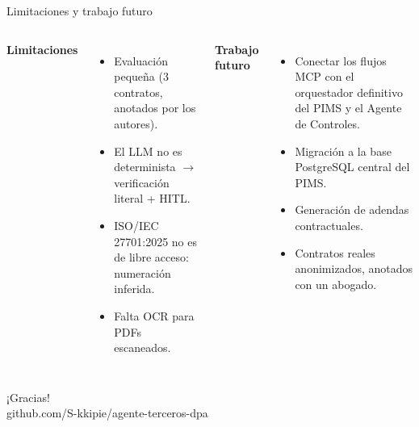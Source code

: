 \documentclass[aspectratio=169,10pt]{beamer}
\begin{document}
\begin{frame}{Limitaciones y trabajo futuro}
\begin{columns}[T]
\textbf{Limitaciones}
\begin{itemize}\small
  \item Evaluación pequeña (3 contratos, anotados por los autores).
  \item El LLM no es determinista $\rightarrow$ verificación literal + HITL.
  \item ISO/IEC 27701:2025 no es de libre acceso: numeración inferida.
  \item Falta OCR para PDFs escaneados.
\end{itemize}
\textbf{Trabajo futuro}
\begin{itemize}\small
  \item Conectar los flujos MCP con el orquestador definitivo del PIMS y el Agente de Controles.
  \item Migración a la base PostgreSQL central del PIMS.
  \item Generación de adendas contractuales.
  \item Contratos reales anonimizados, anotados con un abogado.
\end{itemize}
\end{columns}
\end{frame}

\begin{frame}[standout]
¡Gracias!\\[6pt]
\normalsize github.com/S-kkipie/agente-terceros-dpa
\end{frame}
\end{document}
